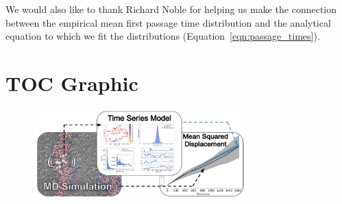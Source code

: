 \documentclass[12pt]{article}
\begin{document}
  We would also like to thank Richard Noble for helping us make the connection 
  between the empirical mean first passage time distribution and the analytical
  equation to which we fit the distributions (Equation~\ref{eqn:passage_times}).
  

  \clearpage

  
  

  \newpage

  \section*{TOC Graphic}
    
  \begin{figure}[!htb]
  \centering
  \includegraphics[width=3.25in]{toc.pdf}
  \end{figure}
\end{document}
